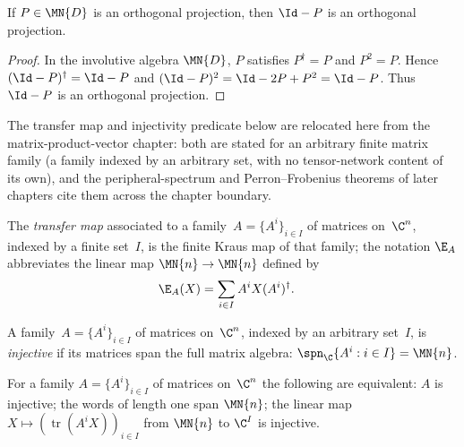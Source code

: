 \begin{theorem}
    \label{thm:orthogonal_projection_complement_channel}
    \leanok
    If $P \in \MN{D}$ is an orthogonal projection, then $\Id-P$ is an
    orthogonal projection.
\end{theorem}

\begin{proof}\leanok
    In the involutive algebra $\MN{D}$, $P$ satisfies $P^\dagger=P$ and
    $P^2=P$. Hence $(\Id-P)^\dagger=\Id-P$ and
    $(\Id-P)^2=\Id-2P+P^2=\Id-P$. Thus $\Id-P$ is an orthogonal projection.
\end{proof}

The transfer map and injectivity predicate below are relocated here from
the matrix-product-vector chapter: both are stated for an arbitrary finite
matrix family (a family indexed by an arbitrary set, with no
tensor-network content of its own), and the peripheral-spectrum and
Perron--Frobenius theorems of later chapters cite them
across the chapter boundary.

\begin{definition}\label{def:transfer_map}
    \leanok
    The \emph{transfer map} associated to a family~$A=\{A^i\}_{i\in I}$ of
    matrices on~$\C^n$, indexed by a finite set~$I$, is the
    finite Kraus map of that family; the notation $\E_A$ abbreviates the
    linear map $\MN{n} \to \MN{n}$ defined by
    \begin{align}
        \E_A(X)
        &= \sum_{i\in I} A^i X (A^i)^\dagger.
        \label{eq:mps_transfer_map}
    \end{align}
\end{definition}

\begin{definition}[Injectivity]\label{def:injective}
    \leanok
    A family~$A=\{A^i\}_{i\in I}$ of matrices on~$\C^n$, indexed by an
    arbitrary set~$I$, is \emph{injective} if its matrices span the
    full matrix algebra:
    $\spn_{\C}\{A^i : i\in I\} = \MN{n}$.
\end{definition}

\begin{lemma}\label{lem:injective_characterizations}
    \leanok
    For a family $A=\{A^i\}_{i\in I}$ of matrices on~$\C^n$ the following are
    equivalent: $A$ is injective; the words of length one span $\MN{n}$; the
    linear map $X\mapsto(\operatorname{tr}(A^iX))_{i\in I}$ from $\MN{n}$ to
    $\C^I$ is injective.
\end{lemma}

